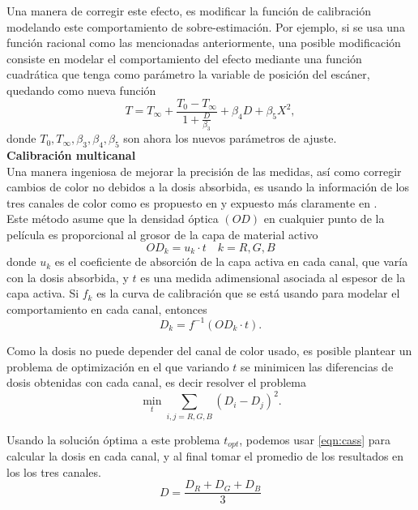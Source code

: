 Una manera de corregir este efecto, es modificar la función de calibración modelando este comportamiento de sobre-estimación. Por ejemplo, si se usa una función racional como las mencionadas anteriormente, una posible modificación consiste en modelar el comportamiento del efecto mediante una función cuadrática que tenga como parámetro la variable de posición del escáner, quedando como nueva función
\begin{equation}
	T=T_{\infty}+\frac{T_0-T_{\infty}}{1+\frac{D}{\beta_{3}}}+\beta_{4}D+\beta_{5}X^2,
\end{equation}
donde $T_0, T_{\infty},\beta_{3},\beta_{4},\beta_{5}$ son ahora los nuevos parámetros de ajuste.\\


\textbf{Calibración multicanal}\\

Una manera ingeniosa de mejorar la precisión de las medidas, así como corregir cambios de color no debidos a la dosis absorbida, es usando la información de los tres canales de color como es propuesto en \cite{Micke2011} y expuesto más claramente en \cite{Li2017}. \\

Este método asume que la densidad óptica $(OD)$ en cualquier punto de la película es proporcional al grosor de la capa de material activo
\begin{equation}
	OD_{k}=u_{k}\cdot t \quad k=R,G,B
\end{equation} 
donde $u_k$ es el coeficiente de absorción de la capa activa en cada canal, que varía con la dosis absorbida, y $t$ es una medida adimensional asociada al espesor de la capa activa. Si $f_k$ es la curva de calibración que se está usando para modelar el comportamiento en cada canal, entonces 
\begin{equation}
\label{eqn:cass}
	D_k=f^{-1}(OD_k\cdot t).
\end{equation}

Como la dosis no puede depender del canal de color usado, es posible plantear un problema de optimización en el que variando $t$ se minimicen las diferencias de dosis obtenidas con cada canal, es decir resolver el problema
\begin{equation}
	\min_{t}\sum_{i,j=R,G,B}(D_i-D_j)^2.
\end{equation}

Usando la solución óptima a este problema $t_{opt}$, podemos usar \eqref{eqn:cass} para calcular la dosis en cada canal, y al final tomar el promedio de los resultados en los los tres canales.
\begin{equation}
	D=\frac{D_R+D_G+D_B}{3}
\end{equation}

